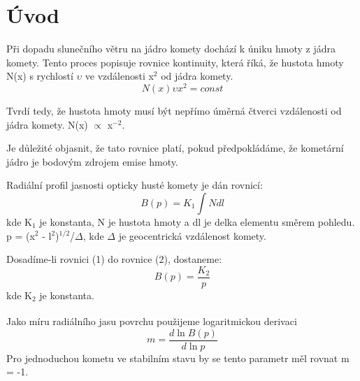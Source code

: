 \documentclass[a4paper,11pt]{article}
\begin{document}
\begin{minipage}[t]{0.5\textwidth}
        \section{Úvod} 
            Při dopadu slunečního větru na jádro komety dochází k úniku hmoty z jádra komety. Tento proces popisuje rovnice kontinuity, která říká, že hustota hmoty N(x) s rychlostí $\upsilon$ ve vzdálenosti x$^2$ od jádra komety.
            \begin{equation}
                N(x) \upsilon x^2 = const
            \end{equation}
            \par Tvrdí tedy, že hustota hmoty musí být nepřímo úměrná čtverci vzdálenosti od jádra komety. N(x) $\propto$  x$^{-2}$.
            \par Je důležité objasnit, že tato rovnice platí, pokud předpokládáme, že kometární jádro je bodovým zdrojem emise hmoty. 
            \par Radiální profil jasnosti opticky husté komety je dán rovnicí:
            \begin{equation}
                B(p) = K_1 \int N dl
            \end{equation}
            kde K$_1$ je konstanta, N je hustota hmoty a dl je delka elementu směrem pohledu. p = (x$^2$ - l$^2$)$^{1/2}$/$\Delta$, kde $\Delta$ je geocentrická vzdálenost komety.
            \par Dosadíme-li rovnici (1) do rovnice (2), dostaneme: 
            \begin{equation}
                B(p) = \frac{K_2}{p}
            \end{equation}
            kde K$_2$ je konstanta.
            \par Jako míru radiálního jasu povrchu použijeme logaritmickou derivaci \textsuperscript{\cite{1987ApJ...317..992J}}
            \begin{equation}
                m = \frac{d \ln B(p)}{d \ln p}
            \end{equation} 
            Pro jednoduchou kometu ve stabilním stavu by se tento parametr měl rovnat m = -1.
    \end{minipage}
    \hspace{10pt}
\end{document}
